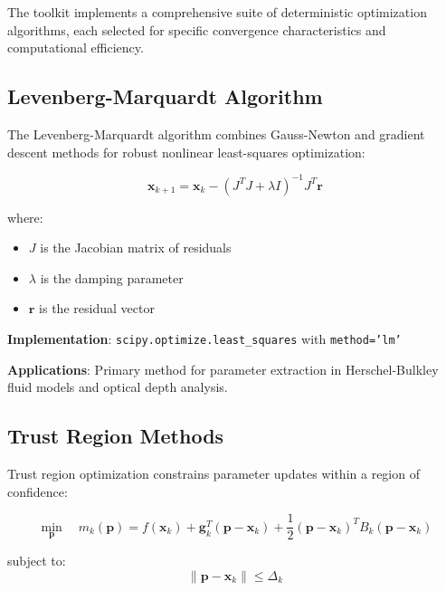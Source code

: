\documentclass[11pt,a4paper]{article}
\begin{document}
The toolkit implements a comprehensive suite of deterministic optimization algorithms, each selected for specific convergence characteristics and computational efficiency.

\subsection{Levenberg-Marquardt Algorithm}
\label{subsec:lm}

The Levenberg-Marquardt algorithm combines Gauss-Newton and gradient descent methods for robust nonlinear least-squares optimization:

\begin{equation}
\mathbf{x}_{k+1} = \mathbf{x}_k - \left(J^T J + \lambda I\right)^{-1} J^T \mathbf{r}
\label{eq:lm_update}
\end{equation}

where:
\begin{itemize}
    \item $J$ is the Jacobian matrix of residuals
    \item $\lambda$ is the damping parameter
    \item $\mathbf{r}$ is the residual vector
\end{itemize}

\textbf{Implementation}: \texttt{scipy.optimize.least\_squares} with \texttt{method='lm'}

\textbf{Applications}: Primary method for parameter extraction in Herschel-Bulkley fluid models and optical depth analysis.

\subsection{Trust Region Methods}
\label{subsec:trust_region}

Trust region optimization constrains parameter updates within a region of confidence:

\begin{equation}
\min_{\mathbf{p}} \quad m_k(\mathbf{p}) = f(\mathbf{x}_k) + \mathbf{g}_k^T (\mathbf{p} - \mathbf{x}_k) + \frac{1}{2} (\mathbf{p} - \mathbf{x}_k)^T B_k (\mathbf{p} - \mathbf{x}_k)
\label{eq:trust_region}
\end{equation}

subject to:
\begin{equation}
\|\mathbf{p} - \mathbf{x}_k\| \leq \Delta_k
\label{eq:trust_constraint}
\end{equation}
\end{document}

